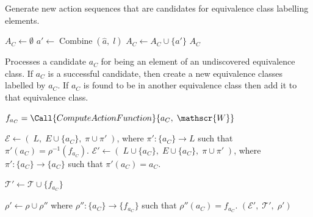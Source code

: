 \begin{algorithm}[H]
\begin{fullwidth}
\caption{
    Generate new action sequences that are candidates for equivalence class labelling elements.
}
\hrulefill
\begin{algorithmic}[1]
    \State $A_{C} \gets \emptyset$
    \State $a' \gets \operatorname{Combine}(\hat{a}, \; l)$
    \State $A_{C} \gets A_{C} \cup \{a'\}$
    \EndFor
    \State \Return $A_{C}$
    \EndFunction
\end{algorithmic}
\end{fullwidth}
\end{algorithm}


\begin{algorithm}[H]
\begin{fullwidth}
\caption{
    Processes a candidate $a_{C}$ for being an element of an undiscovered equivalence class.
    If $a_{C}$ is a successful candidate, then create a new equivalence classes labelled by $a_{C}$.
    If $a_{C}$ is found to be in another equivalence class then add it to that equivalence class.
}
\hrulefill
\begin{algorithmic}[1]
    \State $f_{a_{C}} = \Call{ComputeActionFunction}{a_{C}, \; \mathscr{W}}$

    \Statex {}
    \State $\mathcal{E} \gets (\; L, \; E \cup \{a_{C}\}, \; \pi \cup \pi' \;)$, where $\pi': \{a_{C}\} \to L$ such that $\pi'(a_{C}) = \rho^{-1}(f_{a_{C}})$.
    \Else
    \Statex {}
    \State $\mathcal{E}' \gets (\; L \cup \{a_{C}\}, \; E \cup \{a_{C}\}, \; \pi \cup \pi' \;)$, where $\pi': \{a_{C}\} \to \{a_{C}\}$ such that $\pi'(a_{C}) = a_{C}$.

    \Statex {}
    \State $\mathcal{T}' \gets \mathcal{T} \cup \{f_{a_{C}}\}$

    \Statex {}
    \State $\rho' \gets \rho \cup \rho''$ where $\rho'': \{a_{C}\} \to \{f_{a_{C}}\}$ such that $\rho''(a_{C}) = f_{a_{C}}$.
    \EndIf
    \State \Return $(\mathcal{E}', \; \mathcal{T}', \; \rho')$
    \EndFunction
\end{algorithmic}
\end{fullwidth}
\end{algorithm}


